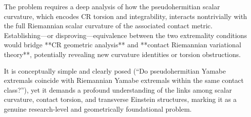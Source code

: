 The problem requires a deep analysis of how the pseudohermitian scalar curvature, which encodes CR torsion and integrability, interacts nontrivially with the full Riemannian scalar curvature of the associated contact metric. Establishing—or disproving—equivalence between the two extremality conditions would bridge **CR geometric analysis** and **contact Riemannian variational theory**, potentially revealing new curvature identities or torsion obstructions.  

It is conceptually simple and clearly posed (“Do pseudohermitian Yamabe extremals coincide with Riemannian Yamabe extremals within the same contact class?”), yet it demands a profound understanding of the links among scalar curvature, contact torsion, and transverse Einstein structures, marking it as a genuine research-level and geometrically foundational problem.